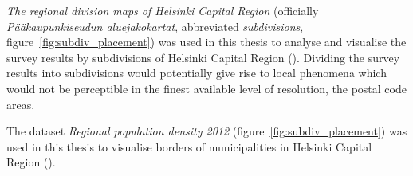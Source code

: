 \textit{The regional division maps of Helsinki Capital Region} (officially \textit{Pääkaupunkiseudun aluejakokartat}, abbreviated \textit{subdivisions}, figure~\ref{fig:subdiv_placement}) was used in this thesis to analyse and visualise the survey results by subdivisions of Helsinki Capital Region (\cite{HelsinginEspoonVantaanjaKauniaistenmittausorganisaatiot2011}). Dividing the survey results into subdivisions would potentially give rise to local phenomena which would not be perceptible in the finest available level of resolution, the postal code areas.

The dataset \textit{Regional population density 2012} (figure~\ref{fig:subdiv_placement}) was used in this thesis to visualise borders of municipalities in Helsinki Capital Region (\cite{StatisticsFinland2012}). 

\begin{figure}[H]%
    \centering
    \quad

\end{figure}
